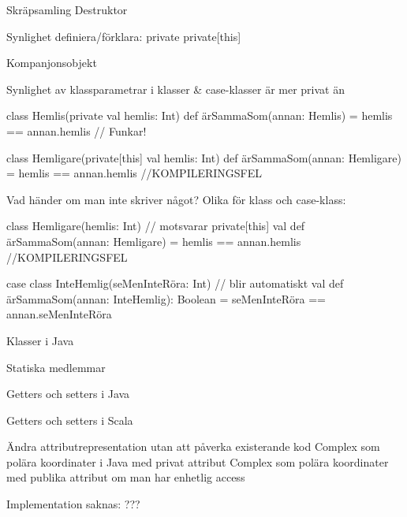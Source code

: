 \begin{Slide}{Skräpsamling}
Destruktor
\end{Slide}


\begin{Slide}{Synlighet}
definiera/förklara:
private
private[this]
\end{Slide}

\begin{Slide}{Kompanjonsobjekt}
\end{Slide}


\begin{Slide}{Synlighet av klassparametrar i klasser \& case-klasser}\SlideFontSmall
{} är  mer privat än  
\begin{Code}
class Hemlis(private val hemlis: Int) {
  def ärSammaSom(annan: Hemlis) = hemlis == annan.hemlis   // Funkar!
}

class Hemligare(private[this] val hemlis: Int) {
  def ärSammaSom(annan: Hemligare) = hemlis == annan.hemlis //KOMPILERINGSFEL
}
\end{Code}
Vad händer om man inte skriver något? Olika för klass och case-klass:
\begin{Code}
class Hemligare(hemlis: Int) { // motsvarar private[this] val
  def ärSammaSom(annan: Hemligare) = hemlis == annan.hemlis //KOMPILERINGSFEL
}

case class InteHemlig(seMenInteRöra: Int) { // blir automatiskt val 
  def ärSammaSom(annan: InteHemlig): Boolean = 
    seMenInteRöra == annan.seMenInteRöra 
}

\end{Code}
\end{Slide}



\begin{Slide}{Klasser i Java}
\end{Slide}

\begin{Slide}{Statiska medlemmar}
\end{Slide}



\begin{Slide}{Getters och setters i Java}
\end{Slide}

\begin{Slide}{Getters och setters i Scala}
\end{Slide}

\begin{Slide}{Ändra attributrepresentation utan att påverka existerande kod}
Complex som polära koordinater i Java med privat attribut
Complex som polära koordinater med publika attribut om man har enhetlig access
\end{Slide}



\begin{Slide}{Implementation saknas: ???}
\end{Slide}


\fi

